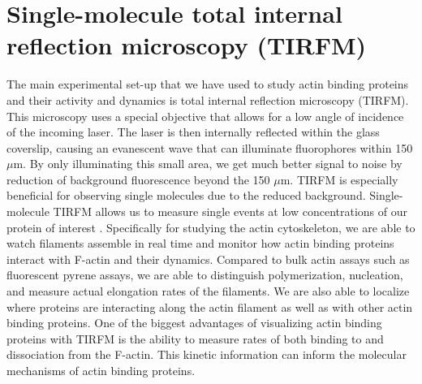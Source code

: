 \section{Single-molecule total internal reflection microscopy (TIRFM)}\label{tirfm}
The main experimental set-up that we have used to study actin binding proteins and their activity and dynamics is total internal reflection microscopy (TIRFM). This microscopy uses a special objective that allows for a low angle of incidence of the incoming laser. The laser is then internally reflected within the glass coverslip, causing an evanescent wave that can illuminate fluorophores within 150 $\mu$m. By only illuminating this small area, we get much better signal to noise by reduction of background fluorescence beyond the 150 $\mu$m. TIRFM is especially beneficial for observing single molecules due to the reduced background. Single-molecule TIRFM allows us to measure single events at low concentrations of our protein of interest \citep{zimmermann_vitro_2016,fish_total_2009}. Specifically for studying the actin cytoskeleton, we are able to watch filaments assemble in real time and monitor how actin binding proteins interact with F-actin and their dynamics. Compared to bulk actin assays such as fluorescent pyrene assays, we are able to distinguish polymerization, nucleation, and measure actual elongation rates of the filaments. We are also able to localize where proteins are interacting along the actin filament as well as with other actin binding proteins. One of the biggest advantages of visualizing actin binding proteins with TIRFM is the ability to measure rates of both binding to and dissociation from the F-actin. This kinetic information can inform the molecular mechanisms of actin binding proteins.